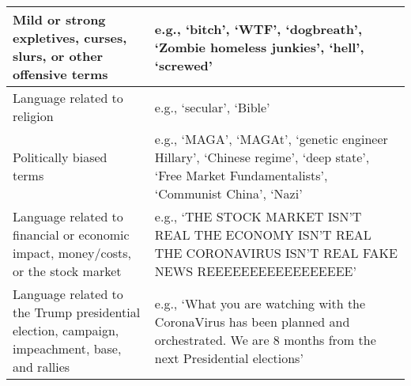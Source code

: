 \documentclass{article}
\begin{document}
\begin{table}[htp]
\begin{tabular}{p{6cm}|p{9cm}}
    \hline
    Mild or strong expletives, curses, slurs, or other offensive terms & e.g., ‘bitch’, ‘WTF’, ‘dogbreath’, ‘Zombie homeless junkies’, ‘hell’, ‘screwed’ \\
    \hline
    Language related to religion & e.g., ‘secular’, ‘Bible’ \\
     \hline
    Politically biased terms & e.g., ‘MAGA’, ‘MAGAt’, ‘genetic engineer Hillary’, ‘Chinese regime’, ‘deep state’, ‘Free Market Fundamentalists’, ‘Communist China’, ‘Nazi’ \\
    \hline
    Language related to financial or economic impact, money/costs, or the stock market & e.g., ‘THE STOCK MARKET ISN’T REAL THE ECONOMY ISN’T REAL THE CORONAVIRUS ISN’T REAL FAKE NEWS REEEEEEEEEEEEEEEEE’ \\
    \hline
    Language related to the Trump presidential election, campaign, impeachment, base, and rallies & e.g., ‘What you are watching with the CoronaVirus has been planned and orchestrated. We are 8 months from the next Presidential elections’ \\
    \hline
  \end{tabular}
  \label{tab:table1words}
\end{table}
\end{document}
